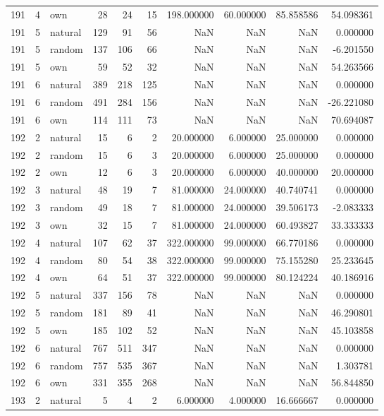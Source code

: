 \begin{table}[htbp]
\begin{tabular}{rrlrrrrrrr}
191 & 4 & own & 28 & 24 & 15 & 198.000000 & 60.000000 & 85.858586 & 54.098361 \\
191 & 5 & natural & 129 & 91 & 56 & NaN & NaN & NaN & 0.000000 \\
191 & 5 & random & 137 & 106 & 66 & NaN & NaN & NaN & -6.201550 \\
191 & 5 & own & 59 & 52 & 32 & NaN & NaN & NaN & 54.263566 \\
191 & 6 & natural & 389 & 218 & 125 & NaN & NaN & NaN & 0.000000 \\
191 & 6 & random & 491 & 284 & 156 & NaN & NaN & NaN & -26.221080 \\
191 & 6 & own & 114 & 111 & 73 & NaN & NaN & NaN & 70.694087 \\
192 & 2 & natural & 15 & 6 & 2 & 20.000000 & 6.000000 & 25.000000 & 0.000000 \\
192 & 2 & random & 15 & 6 & 3 & 20.000000 & 6.000000 & 25.000000 & 0.000000 \\
192 & 2 & own & 12 & 6 & 3 & 20.000000 & 6.000000 & 40.000000 & 20.000000 \\
192 & 3 & natural & 48 & 19 & 7 & 81.000000 & 24.000000 & 40.740741 & 0.000000 \\
192 & 3 & random & 49 & 18 & 7 & 81.000000 & 24.000000 & 39.506173 & -2.083333 \\
192 & 3 & own & 32 & 15 & 7 & 81.000000 & 24.000000 & 60.493827 & 33.333333 \\
192 & 4 & natural & 107 & 62 & 37 & 322.000000 & 99.000000 & 66.770186 & 0.000000 \\
192 & 4 & random & 80 & 54 & 38 & 322.000000 & 99.000000 & 75.155280 & 25.233645 \\
192 & 4 & own & 64 & 51 & 37 & 322.000000 & 99.000000 & 80.124224 & 40.186916 \\
192 & 5 & natural & 337 & 156 & 78 & NaN & NaN & NaN & 0.000000 \\
192 & 5 & random & 181 & 89 & 41 & NaN & NaN & NaN & 46.290801 \\
192 & 5 & own & 185 & 102 & 52 & NaN & NaN & NaN & 45.103858 \\
192 & 6 & natural & 767 & 511 & 347 & NaN & NaN & NaN & 0.000000 \\
192 & 6 & random & 757 & 535 & 367 & NaN & NaN & NaN & 1.303781 \\
192 & 6 & own & 331 & 355 & 268 & NaN & NaN & NaN & 56.844850 \\
193 & 2 & natural & 5 & 4 & 2 & 6.000000 & 4.000000 & 16.666667 & 0.000000 \\

\end{tabular}
\end{table}
